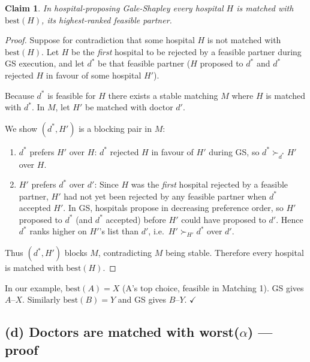 \documentclass[11pt]{article}
\newtheorem*{claim}{Claim}
\begin{document}
\begin{claim}
In hospital-proposing Gale-Shapley every hospital $H$ is matched with $\mathrm{best}(H)$, its highest-ranked feasible partner.
\end{claim}
\begin{proof}
Suppose for contradiction that some hospital $H$ is not matched with $\mathrm{best}(H)$.  Let $H$ be the \emph{first} hospital to be rejected by a feasible partner during GS execution, and let $d^*$ be that feasible partner ($H$ proposed to $d^*$ and $d^*$ rejected $H$ in favour of some hospital $H'$).

Because $d^*$ is feasible for $H$ there exists a stable matching $M$ where $H$ is matched with $d^*$.  In $M$, let $H'$ be matched with doctor $d'$.

We show $(d^*, H')$ is a blocking pair in $M$:
\begin{enumerate}
  \item $d^*$ prefers $H'$ over $H$: $d^*$ rejected $H$ in favour of $H'$ during GS, so $d^* \succ_{d^*} H'$ over $H$.
  \item $H'$ prefers $d^*$ over $d'$: Since $H$ was the \emph{first} hospital rejected by a feasible partner, $H'$ had not yet been rejected by any feasible partner when $d^*$ accepted $H'$.  In GS, hospitals propose in decreasing preference order, so $H'$ proposed to $d^*$ (and $d^*$ accepted) before $H'$ could have proposed to $d'$.  Hence $d^*$ ranks higher on $H'$'s list than $d'$, i.e.\ $H' \succ_{H'} d^*$ over $d'$.
\end{enumerate}

Thus $(d^*,H')$ blocks $M$, contradicting $M$ being stable.  Therefore every hospital is matched with $\mathrm{best}(H)$.
\end{proof}

In our example, $\mathrm{best}(A)=X$ (A's top choice, feasible in Matching 1).  GS gives $A$--$X$.  Similarly $\mathrm{best}(B)=Y$ and GS gives $B$--$Y$. $\checkmark$

\subsection*{(d) Doctors are matched with worst($\alpha$) --- proof}
\end{document}
